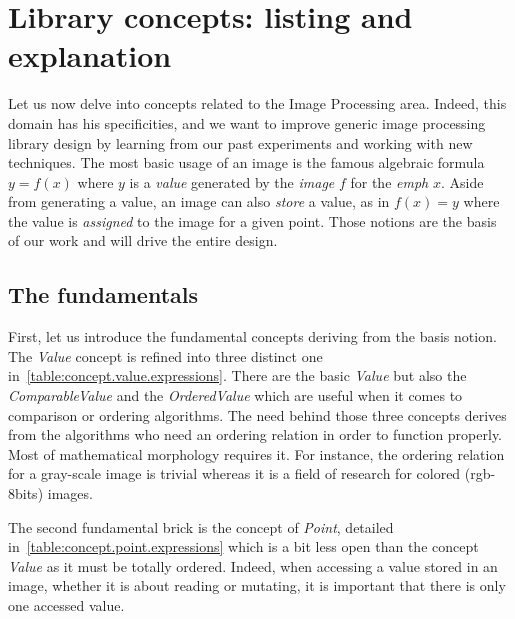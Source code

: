 \section{Library concepts: listing and explanation}
\label{sec:library.concepts}

Let us now delve into concepts related to the Image Processing area. Indeed, this domain has his specificities, and we
want to improve generic image processing library design by learning from our past experiments and working with new
techniques. The most basic usage of an image is the famous algebraic formula \(y = f(x)\) where \(y\) is a \emph{value}
generated by the \emph{image} \(f\) for the \emph{emph} \(x\). Aside from generating a value, an image can also
\emph{store} a value, as in \(f(x) = y\) where the value is \emph{assigned} to the image for a given point. Those
notions are the basis of our work and will drive the entire design.

\subsection{The fundamentals}

\label{subsec:fundamentals}

First, let us introduce the fundamental concepts deriving from the basis notion. The \emph{Value} concept is refined
into three distinct one in~\cref{table:concept.value.expressions}. There are the basic \emph{Value} but also the
\emph{ComparableValue} and the \emph{OrderedValue} which are useful when it comes to comparison or ordering algorithms.
The need behind those three concepts derives from the algorithms who need an ordering relation in order to function
properly. Most of mathematical morphology requires it. For instance, the ordering relation for a gray-scale image is
trivial whereas it is a field of research for colored (rgb-8bits) images.

The second fundamental brick is the concept of \emph{Point}, detailed in~\cref{table:concept.point.expressions} which is
a bit less open than the concept \emph{Value} as it must be totally ordered. Indeed, when accessing a value stored in an
image, whether it is about reading or mutating, it is important that there is only one accessed value.


